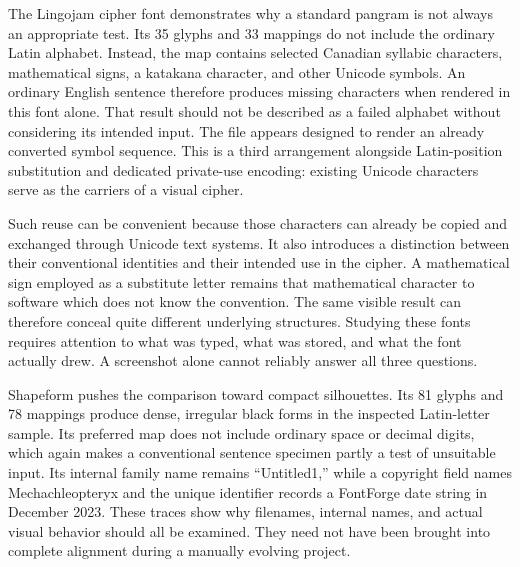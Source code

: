 \documentclass[11pt]{article}
\begin{document}
The Lingojam cipher font demonstrates why a standard pangram is not always an appropriate test. Its 35 glyphs and 33 mappings do not include the ordinary Latin alphabet. Instead, the map contains selected Canadian syllabic characters, mathematical signs, a katakana character, and other Unicode symbols. An ordinary English sentence therefore produces missing characters when rendered in this font alone. That result should not be described as a failed alphabet without considering its intended input. The file appears designed to render an already converted symbol sequence. This is a third arrangement alongside Latin-position substitution and dedicated private-use encoding: existing Unicode characters serve as the carriers of a visual cipher.

Such reuse can be convenient because those characters can already be copied and exchanged through Unicode text systems. It also introduces a distinction between their conventional identities and their intended use in the cipher. A mathematical sign employed as a substitute letter remains that mathematical character to software which does not know the convention. The same visible result can therefore conceal quite different underlying structures. Studying these fonts requires attention to what was typed, what was stored, and what the font actually drew. A screenshot alone cannot reliably answer all three questions.

Shapeform pushes the comparison toward compact silhouettes. Its 81 glyphs and 78 mappings produce dense, irregular black forms in the inspected Latin-letter sample. Its preferred map does not include ordinary space or decimal digits, which again makes a conventional sentence specimen partly a test of unsuitable input. Its internal family name remains ``Untitled1,'' while a copyright field names Mechachleopteryx and the unique identifier records a FontForge date string in December 2023. These traces show why filenames, internal names, and actual visual behavior should all be examined. They need not have been brought into complete alignment during a manually evolving project.
\end{document}
